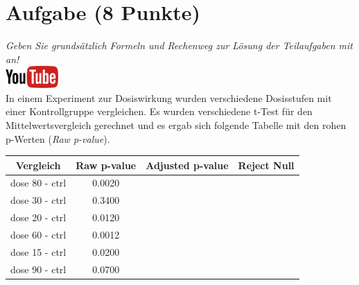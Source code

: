 \documentclass[a4paper, 9pt]{scrartcl}\usepackage[]{graphicx}\usepackage[]{xcolor}
\newenvironment{knitrout}{}{} %
\begin{document}
\section{Aufgabe \hfill (8 Punkte)}

\textit{Geben Sie grunds{\"a}tzlich Formeln und Rechenweg zur L{\"o}sung der
  Teilaufgaben mit an!} \\[1Ex]

 \hfill\href{https://youtu.be/hr_jPd1hpKY}{\includegraphics[width =
   2cm]{img/youtube}}\\[1Ex]


In einem Experiment zur Dosiswirkung wurden verschiedene Dosisstufen mit
einer Kontrollgruppe vergleichen. Es wurden verschiedene t-Test f{\"u}r den
Mittelwertsvergleich gerechnet und es ergab sich folgende Tabelle mit den
rohen p-Werten (\textit{Raw p-value}).


\begin{knitrout}
\color{fgcolor}\begin{table}[!h]
\centering\begingroup\fontsize{12}{14}\selectfont

\begin{tabular}{cccc}
\toprule
Vergleich & Raw p-value & Adjusted p-value & Reject Null\\
\midrule
dose 80 - ctrl & 0.0020 &  & \\
dose 30 - ctrl & 0.3400 &  & \\
dose 20 - ctrl & 0.0120 &  & \\
dose 60 - ctrl & 0.0012 &  & \\
dose 15 - ctrl & 0.0200 &  & \\
\addlinespace
dose 90 - ctrl & 0.0700 &  & \\
\bottomrule
\end{tabular}
\endgroup{}
\end{table}

\end{knitrout}


\end{document}
